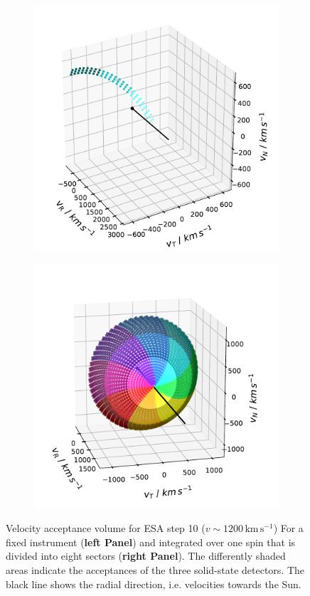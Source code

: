 %
%
%
\begin{figure}
	\centering
	\begin{subfigure}{.5\textwidth}
		\centering
		\includegraphics[width=1\linewidth]{Figures/col_single_new.pdf}
	\end{subfigure}%
	\begin{subfigure}{.5\textwidth}
		\centering
		\includegraphics[width=1\linewidth]{Figures/col_vspace_normal.pdf}
	\end{subfigure}
	\caption{Velocity acceptance volume for ESA step 10 ($v \sim 1200\,\mathrm{km\,s^{-1}}$)  For a fixed instrument (\textbf{left Panel}) and integrated over one spin that is divided into eight sectors (\textbf{right Panel}). The differently shaded areas indicate the acceptances of the three solid-state detectors. The black line shows the radial direction, i.e. velocities towards the Sun.}
	\label{fig:coll_FoV}
\end{figure}
